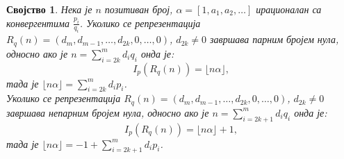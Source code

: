 \documentclass[a4paper]{article}
\newtheorem{property}{Својство}
\begin{document}
\begin{property}
	\label{prop:r_q_nule}
	Нека је $ n $ позитиван број, $ \alpha = [1, a_{1}, a_{2}, \ldots] $ ирационалан са конвергентима $ {\frac{p_{i}}{q_{i}}} $. Уколико се репрезентација $ R_q(n) = (d_{m}, d_{m-1}, \ldots , d_{2k}, 0, \ldots, 0) $, $ d_{2k} \neq 0 $ завршава парним бројем нула, односно ако је $ n = \sum_{i = 2k}^{m} d_{i}q_{i} $ онда је:	
		\begin{displaymath}
			I_{p}(R_q(n)) = \lfloor n \alpha \rfloor,
		\end{displaymath}	
	тада је $ \lfloor n \alpha \rfloor = \sum_{i = 2k}^{m} d_{i}p_{i} $.\\	
	Уколико се репрезентација $ R_q(n) = (d_{m}, d_{m-1}, \ldots , d_{2k}, 0, \ldots, 0) $, $ d_{2k} \neq 0 $ завршава непарним бројем нула, односно ако је $ n = \sum_{i = 2k+1}^{m} d_{i}q_{i} $ онда је:
		\begin{displaymath}
			I_{p}(R_q(n)) = \lfloor n \alpha \rfloor + 1,
		\end{displaymath}
	тада је $ \lfloor n \alpha \rfloor = -1 + \sum_{i = 2k+1}^{m} d_{i}p_{i} $.	
\end{property}
\end{document}
